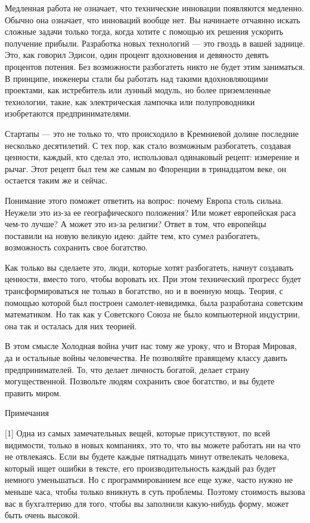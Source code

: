 \documentclass[ebook,12pt,oneside,openany]{memoir}
\begin{document}
Медленная работа не означает, что технические инновации появляются
медленно. Обычно она означает, что инноваций вообще нет. Вы начинаете
отчаянно искать сложные задачи только тогда, когда хотите с помощью их
решения ускорить получение прибыли. Разработка новых технологий — это
гвоздь в вашей заднице. Это, как говорил Эдисон, один процент
вдохновения и девяносто девять процентов потения. Без возможности
разбогатеть никто не будет этим заниматься. В принципе, инженеры стали
бы работать над такими вдохновляющими проектами, как истребитель или
лунный модуль, но более приземленные технологии, такие, как
электрическая лампочка или полупроводники изобретаются
предпринимателями.

Стартапы — это не только то, что происходило в Кремниевой долине
последние несколько десятилетий. С тех пор, как стало возможным
разбогатеть, создавая ценности, каждый, кто сделал это, использовал
одинаковый рецепт: измерение и рычаг. Этот рецепт был тем же самым во
Флоренции в тринадцатом веке, он остается таким же и сейчас.

Понимание этого поможет ответить на вопрос: почему Европа столь
сильна. Неужели это из-за ее географического положения? Или может
европейская раса чем-то лучше? А может это из-за религии? Ответ в том,
что европейцы поставили на новую великую идею: дайте тем, кто сумел
разбогатеть, возможность сохранить свое богатство.

Как только вы сделаете это, люди, которые хотят разбогатеть, начнут
создавать ценности, вместо того, чтобы воровать их. При этом
технический прогресс будет трансформироваться не только в богатство,
но и в военную мощь. Теория, с помощью которой был построен
самолет-невидимка, была разработана советским математиком. Но так как
у Советского Союза не было компьютерной индустрии, она так и осталась
для них теорией.

В этом смысле Холодная война учит нас тому же уроку, что и Вторая
Мировая, да и остальные войны человечества. Не позволяйте правящему
классу давить предпринимателей. То, что делает личность богатой,
делает страну могущественной. Позвольте людям сохранить свое
богатство, и вы будете править миром.

Примечания

[1] Одна из самых замечательных вещей, которые присутствуют, по всей
видимости, только в новых компаниях, это то, что вы можете работать ни
на что не отвлекаясь. Если вы будете каждые пятнадцать минут
отвелекать человека, который ищет ошибки в тексте, его
производительность каждый раз будет немного уменьшаться. Но с
программированием все еще хуже, часто нужно не меньше часа, чтобы
только вникнуть в суть проблемы. Поэтому стоимость вызова вас в
бухгалтерию для того, чтобы вы заполнили какую-нибудь форму, может
быть очень высокой.
\end{document}
